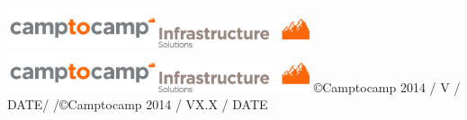 \usepackage{lastpage}
\usepackage[headsepline,footsepline]{scrlayer-scrpage}


\newcommand{\ctoclogo}{\includegraphics[width=12em]{camptocamp.png}}
\newcommand{\ctocinfralogo}{\includegraphics[width=12em]{rapport_logo_haut_droite_infrastructure_rgb.png}}
\newcommand{\ctocinfraheader}{\ctoclogo\hfill{}\ctocinfralogo}

%
  {%
    {\ctocinfraheader}
    {\ctocinfraheader}
    {}
  }%
  {%
    {\color{c2c}\textrm\copyright Camptocamp 2014 / V\docversion{} / DATE\hfill\pagemark/\pageref{LastPage}}
    {\color{c2c}\textrm\pagemark/\pageref{LastPage}\hfill{}\copyright Camptocamp 2014 / VX.X / DATE}
    {}
  } %

\pagestyle{c2c}
\renewcommand*{\chapterpagestyle}{c2c}
